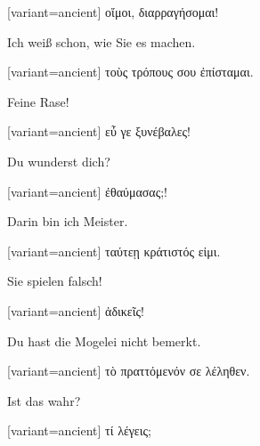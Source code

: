 \switchcolumn

\begin{greek}[variant=ancient]%
οἴμοι, διαρραγήσομαι!

\end{greek}%
\switchcolumn*

Ich weiß schon, wie Sie es machen.

\switchcolumn

\begin{greek}[variant=ancient]%
τοὺς τρόπους σου ἐπίσταμαι.

\end{greek}%
\switchcolumn*

Feine Rase!

\switchcolumn

\begin{greek}[variant=ancient]%
εὖ γε ξυνέβαλες!

\end{greek}%
\switchcolumn*

Du wunderst dich?

\switchcolumn

\begin{greek}[variant=ancient]%
ἐθαύμασας;!

\end{greek}%
\switchcolumn*

Darin bin ich Meister.

\switchcolumn

\begin{greek}[variant=ancient]%
ταύτεῃ κράτιστός εἰμι.

\end{greek}%
\switchcolumn*

Sie spielen falsch!

\switchcolumn

\begin{greek}[variant=ancient]%
ἀδικεῖς!

\end{greek}%
\switchcolumn*

Du hast die Mogelei nicht bemerkt.

\switchcolumn

\begin{greek}[variant=ancient]%
τὸ πραττόμενόν σε λέληθεν.

\end{greek}%
\switchcolumn*

Ist das wahr?

\switchcolumn

\begin{greek}[variant=ancient]%
τί λέγεις;

\end{greek}%
\switchcolumn*


